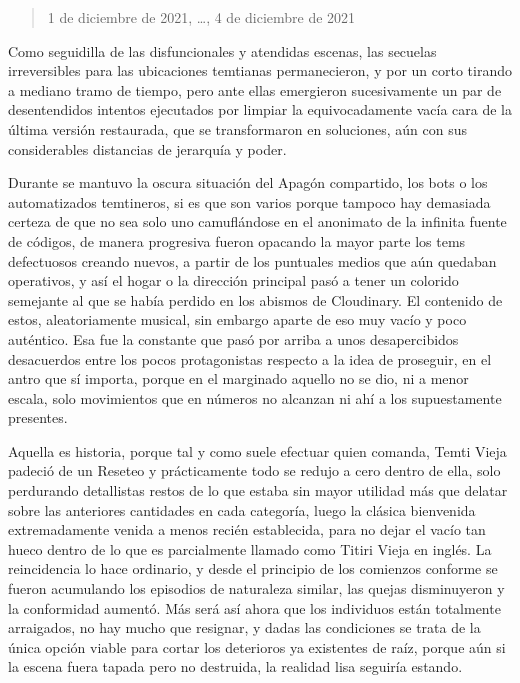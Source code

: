 \documentclass[
  spanish,
]{book}
\begin{document}
\begin{quote}
1 de diciembre de 2021, \ldots, 4 de diciembre de 2021
\end{quote}

Como seguidilla de las disfuncionales y atendidas escenas, las secuelas irreversibles para las ubicaciones temtianas permanecieron, y por un corto tirando a mediano tramo de tiempo, pero ante ellas emergieron sucesivamente un par de desentendidos intentos ejecutados por limpiar la equivocadamente vacía cara de la última versión restaurada, que se transformaron en soluciones, aún con sus considerables distancias de jerarquía y poder.

Durante se mantuvo la oscura situación del Apagón compartido, los bots o los automatizados temtineros, si es que son varios porque tampoco hay demasiada certeza de que no sea solo uno camuflándose en el anonimato de la infinita fuente de códigos, de manera progresiva fueron opacando la mayor parte los tems defectuosos creando nuevos, a partir de los puntuales medios que aún quedaban operativos, y así el hogar o la dirección principal pasó a tener un colorido semejante al que se había perdido en los abismos de Cloudinary. El contenido de estos, aleatoriamente musical, sin embargo aparte de eso muy vacío y poco auténtico. Esa fue la constante que pasó por arriba a unos desapercibidos desacuerdos entre los pocos protagonistas respecto a la idea de proseguir, en el antro que sí importa, porque en el marginado aquello no se dio, ni a menor escala, solo movimientos que en números no alcanzan ni ahí a los supuestamente presentes.

Aquella es historia, porque tal y como suele efectuar quien comanda, Temti Vieja padeció de un Reseteo y prácticamente todo se redujo a cero dentro de ella, solo perdurando detallistas restos de lo que estaba sin mayor utilidad más que delatar sobre las anteriores cantidades en cada categoría, luego la clásica bienvenida extremadamente venida a menos recién establecida, para no dejar el vacío tan hueco dentro de lo que es parcialmente llamado como Titiri Vieja en inglés. La reincidencia lo hace ordinario, y desde el principio de los comienzos conforme se fueron acumulando los episodios de naturaleza similar, las quejas disminuyeron y la conformidad aumentó. Más será así ahora que los individuos están totalmente arraigados, no hay mucho que resignar, y dadas las condiciones se trata de la única opción viable para cortar los deterioros ya existentes de raíz, porque aún si la escena fuera tapada pero no destruida, la realidad lisa seguiría estando.
\end{document}
